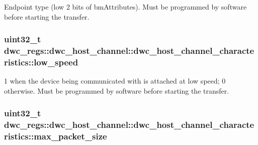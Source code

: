 Endpoint type (low 2 bits of bm\-Attributes). Must be programmed by software before starting the transfer. \hypertarget{uniondwc__regs_1_1dwc__host__channel_1_1dwc__host__channel__characteristics_adbb8153fd463b5f254e88a01776c7eec}{
\subsubsection[{low\-\_\-speed}]{\setlength{\rightskip}{0pt plus 5cm}uint32\-\_\-t dwc\-\_\-regs\-::dwc\-\_\-host\-\_\-channel\-::dwc\-\_\-host\-\_\-channel\-\_\-characteristics\-::low\-\_\-speed}}\label{uniondwc__regs_1_1dwc__host__channel_1_1dwc__host__channel__characteristics_adbb8153fd463b5f254e88a01776c7eec}
1 when the device being communicated with is attached at low speed; 0 otherwise. Must be programmed by software before starting the transfer. \hypertarget{uniondwc__regs_1_1dwc__host__channel_1_1dwc__host__channel__characteristics_ada8166e0970492a9eb61b1473d5679c2}{
\subsubsection[{max\-\_\-packet\-\_\-size}]{\setlength{\rightskip}{0pt plus 5cm}uint32\-\_\-t dwc\-\_\-regs\-::dwc\-\_\-host\-\_\-channel\-::dwc\-\_\-host\-\_\-channel\-\_\-characteristics\-::max\-\_\-packet\-\_\-size}}\label{uniondwc__regs_1_1dwc__host__channel_1_1dwc__host__channel__characteristics_ada8166e0970492a9eb61b1473d5679c2}
